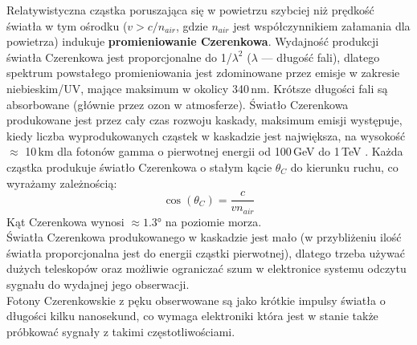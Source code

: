 \documentclass[a4paper,11pt,twoside]{article}
\begin{document}
Relatywistyczna cząstka poruszająca się w powietrzu szybciej niż prędkość światła w tym ośrodku ($v > c/n_{air}$, gdzie $n_{air}$ jest współczynnikiem załamania dla powietrza) indukuje {\bf{promieniowanie Czerenkowa}}.
Wydajność produkcji światła Czerenkowa jest proporcjonalne do 1/$\lambda^2$ ($\lambda$ --- długość fali), dlatego spektrum powstałego promieniowania jest zdominowane przez emisje w zakresie niebieskim/UV, mające maksimum w okolicy 340\,nm. Krótsze długości fali są absorbowane (głównie przez ozon w atmosferze). Światło Czerenkowa produkowane jest przez cały czas rozwoju kaskady, maksimum emisji występuje, kiedy liczba wyprodukowanych cząstek w kaskadzie jest największa, na wysokość $\approx$ 10\,km dla fotonów gamma o pierwotnej energii od 100\,GeV do 1\,TeV \cite{IACT}. Każda cząstka produkuje światło Czerenkowa o stałym kącie $\theta_C$ do kierunku ruchu, co wyrażamy zależnością:
\begin{equation}
\cos (\theta_C) = \frac{c}{v n_{air}}
\end{equation}
Kąt Czerenkowa wynosi $\approx \ang{1.3}$ na poziomie morza. \\
Światła Czerenkowa produkowanego w kaskadzie jest mało (w przybliżeniu ilość światła proporcjonalna jest do energii cząstki pierwotnej), dlatego trzeba używać dużych teleskopów oraz możliwie ograniczać szum w elektronice systemu odczytu sygnału do wydajnej jego obserwacji. \\
Fotony Czerenkowskie z pęku obserwowane są jako krótkie impulsy światła o długości kilku nanosekund, co wymaga elektroniki która jest w stanie także próbkować sygnały z takimi częstotliwościami. 
\end{document}
